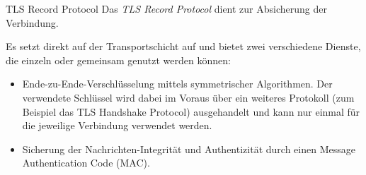 \begin{defi}{TLS Record Protocol}
    Das \emph{TLS Record Protocol} dient zur Absicherung der Verbindung.

    Es setzt direkt auf der Transportschicht auf und bietet zwei verschiedene Dienste, die einzeln oder gemeinsam genutzt werden können:
    \begin{itemize}
        \item Ende-zu-Ende-Verschlüsselung mittels symmetrischer Algorithmen. Der verwendete Schlüssel wird dabei im Voraus über ein weiteres Protokoll (zum Beispiel das TLS Handshake Protocol) ausgehandelt und kann nur einmal für die jeweilige Verbindung verwendet werden.
        \item Sicherung der Nachrichten-Integrität und Authentizität durch einen Message Authentication Code (MAC).
    \end{itemize}
\end{defi}

